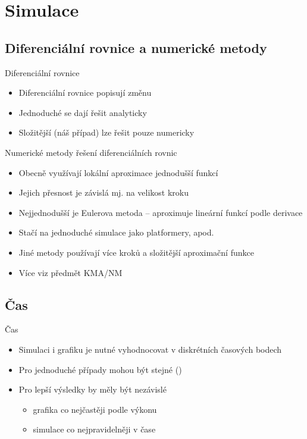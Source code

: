 \documentclass[aspectratio=169,xcolor=dvipsnames]{beamer}
\begin{document}
\section{Simulace}
\subsection{Diferenciální rovnice a numerické metody}
\begin{frame}{Diferenciální rovnice}
  \begin{itemize}
    \item Diferenciální rovnice popisují změnu
    \item Jednoduché se dají řešit analyticky
    \item Složitější (náš případ) lze řešit pouze numericky
  \end{itemize}
  \vspace{0.25cm}
  \cite{hirsch1970}
\end{frame}
\begin{frame}{Numerické metody řešení diferenciálních rovnic}
  \begin{itemize}
    \item Obecně využívají lokální aproximace jednodušší funkcí
    \item Jejich přesnost je závislá mj. na velikost kroku
    \item Nejjednodušší je Eulerova metoda -- aproximuje lineární funkcí podle
      derivace
    \item Stačí na jednoduché simulace jako platformery, apod.
    \item Jiné metody používají více kroků a složitější aproximační funkce
    \item Více viz předmět KMA/NM \cite{prikryl_brandner}
  \end{itemize}
\end{frame}
\subsection{Čas}
\begin{frame}{Čas}
  \begin{itemize}
    \item Simulaci i grafiku je nutné vyhodnocovat v diskrétních časových bodech
    \item Pro jednoduché případy mohou být stejné
      ()
    \item Pro lepší výsledky by měly být nezávislé
      \begin{itemize}
        \item grafika co nejčastěji podle výkonu
        \item simulace co nejpravidelněji v čase
      \end{itemize}
      \vspace{0.25cm}
      \cite{eberly2010}
  \end{itemize}
\end{frame}
\end{document}
